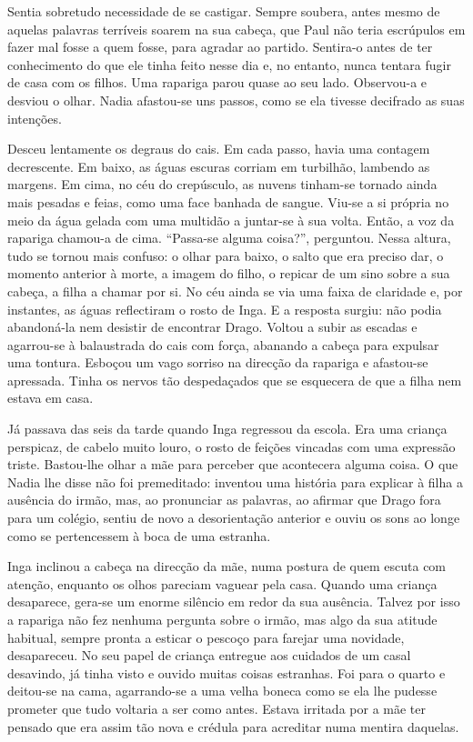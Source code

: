 Sentia sobretudo necessidade de se castigar. Sempre soubera, antes mesmo
de aquelas palavras terríveis soarem na sua cabeça, que Paul não teria
escrúpulos em fazer mal fosse a quem fosse, para agradar ao partido.
Sentira-o antes de ter conhecimento do que ele tinha feito nesse dia e,
no entanto, nunca tentara fugir de casa com os filhos. Uma rapariga
parou quase ao seu lado. Observou-a e desviou o olhar. Nadia afastou-se
uns passos, como se ela tivesse decifrado as suas intenções.

Desceu lentamente os degraus do cais. Em cada passo, havia uma contagem
decrescente. Em baixo, as águas escuras corriam em turbilhão, lambendo
as margens. Em cima, no céu do crepúsculo, as nuvens tinham-se tornado
ainda mais pesadas e feias, como uma face banhada de sangue. Viu-se a si
própria no meio da água gelada com uma multidão a juntar-se à sua
volta. Então, a voz da rapariga chamou-a de cima. ``Passa-se alguma
coisa?'', perguntou. Nessa altura, tudo se tornou mais confuso: o olhar
para baixo, o salto que era preciso dar, o momento anterior à
morte, a imagem do filho, o repicar de um sino sobre a sua cabeça, a
filha a chamar por si. No céu ainda se via uma faixa de claridade e, por
instantes, as águas reflectiram o rosto de Inga. E a resposta surgiu:
não podia abandoná-la nem desistir de encontrar Drago. Voltou a subir as
escadas e agarrou-se à balaustrada do cais com força, abanando a cabeça
para expulsar uma tontura. Esboçou um vago sorriso na direcção da
rapariga e afastou-se apressada. Tinha os nervos tão despedaçados que se
esquecera de que a filha nem estava em casa.

Já passava das seis da tarde quando Inga regressou da escola. Era uma
criança perspicaz, de cabelo muito louro, o rosto de feições vincadas
com uma expressão triste. Bastou-lhe olhar a mãe para perceber que
acontecera alguma coisa. O que Nadia lhe disse não foi premeditado:
inventou uma história para explicar à filha a ausência do irmão, mas, ao
pronunciar as palavras, ao afirmar que Drago fora para um colégio,
sentiu de novo a desorientação anterior e ouviu os sons ao longe como
se pertencessem à boca de uma estranha.

Inga inclinou a cabeça na direcção da mãe, numa postura de quem escuta
com atenção, enquanto os olhos pareciam vaguear pela casa. Quando uma
criança desaparece, gera-se um enorme silêncio em redor da sua
ausência. Talvez por isso a rapariga não fez nenhuma pergunta sobre o
irmão, mas algo da sua atitude habitual, sempre pronta a esticar o
pescoço para farejar uma novidade, desapareceu. No seu papel de
criança entregue aos cuidados de um casal desavindo, já tinha visto e
ouvido muitas coisas estranhas. Foi para o quarto e deitou-se na cama,
agarrando-se a uma velha boneca como se ela lhe pudesse prometer que tudo
voltaria a ser como antes. Estava irritada por a mãe ter pensado que
era assim tão nova e crédula para acreditar numa mentira daquelas.

